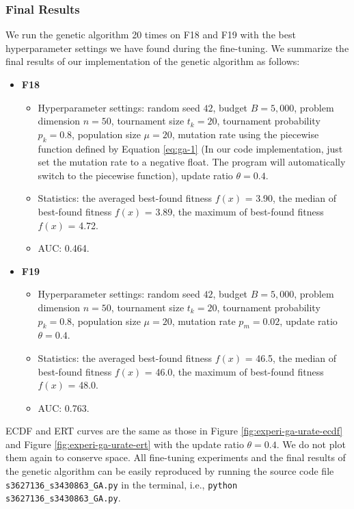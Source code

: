 \documentclass{article}
\begin{document}
\subsubsection{Final Results}
We run the genetic algorithm 20 times on F18 and F19 with the best hyperparameter settings we have found during the fine-tuning. We summarize the final results of our implementation of the genetic algorithm as follows:

\begin{itemize}
    \item \textbf{F18}
        \begin{itemize}
            \item Hyperparameter settings: random seed $42$, budget $B = 5,000$, problem dimension $n = 50$, tournament size $t_k = 20$, tournament probability $p_k = 0.8$, population size $\mu = 20$, mutation rate using the piecewise function defined by Equation \ref{eq:ga-1} (In our code implementation, just set the mutation rate to a negative float. The program will automatically switch to the piecewise function), update ratio $\theta = 0.4$.
            \item Statistics: the averaged best-found fitness $f(x)$ = 3.90, the median of best-found fitness $f(x)$ = 3.89, the maximum of best-found fitness $f(x)$ = 4.72.
            \item AUC: 0.464.
        \end{itemize}
    \item \textbf{F19}
        \begin{itemize}
            \item Hyperparameter settings: random seed $42$, budget $B = 5,000$, problem dimension $n = 50$, tournament size $t_k = 20$, tournament probability $p_k = 0.8$, population size $\mu = 20$, mutation rate $p_m = 0.02$, update ratio $\theta = 0.4$.
            \item Statistics: the averaged best-found fitness $f(x)$ = 46.5, the median of best-found fitness $f(x)$ = 46.0, the maximum of best-found fitness $f(x)$ = 48.0.
            \item AUC: 0.763.
        \end{itemize}
\end{itemize}

ECDF and ERT curves are the same as those in Figure \ref{fig:experi-ga-urate-ecdf} and Figure \ref{fig:experi-ga-urate-ert} with the update ratio $\theta = 0.4$. We do not plot them again to conserve space. All fine-tuning experiments and the final results of the genetic algorithm can be easily reproduced by running the source code file \texttt{s3627136\_s3430863\_GA.py} in the terminal, i.e., \texttt{python s3627136\_s3430863\_GA.py}.
\end{document}
